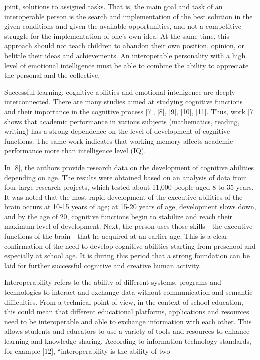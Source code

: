 \documentclass{article}
\begin{document}
\begin{multicols}{2}
joint, solutions to assigned tasks. That is, the main
goal and task of an interoperable person is the search
and implementation of the best solution in the given
conditions and given the available opportunities, and not
a competitive struggle for the implementation of one’s
own idea. At the same time, this approach should not
teach children to abandon their own position, opinion, or
belittle their ideas and achievements. An interoperable
personality with a high level of emotional intelligence
must be able to combine the ability to appreciate the
personal and the collective.
\par Successful learning, cognitive abilities and emotional
intelligence are deeply interconnected. There are many
studies aimed at studying cognitive functions and their
importance in the cognitive process [7], [8], [9], [10],
[11]. Thus, work [7] shows that academic performance
in various subjects (mathematics, reading, writing) has
a strong dependence on the level of development of
cognitive functions. The same work indicates that working memory affects academic performance more than
intelligence level (IQ).
\par In [8], the authors provide research data on the development of cognitive abilities depending on age. The
results were obtained based on an analysis of data from
four large research projects, which tested about 11,000
people aged 8 to 35 years. It was noted that the most rapid
development of the executive abilities of the brain occurs
at 10-15 years of age; at 15-20 years of age, development
slows down, and by the age of 20, cognitive functions
begin to stabilize and reach their maximum level of
development. Next, the person uses those skills—the
executive functions of the brain—that he acquired at an
earlier age. This is a clear confirmation of the need to
develop cognitive abilities starting from preschool and
especially at school age. It is during this period that
a strong foundation can be laid for further successful
cognitive and creative human activity.
\par Interoperability refers to the ability of different systems, programs and technologies to interact and exchange
data without communication and semantic difficulties.
From a technical point of view, in the context of school
education, this could mean that different educational
platforms, applications and resources need to be interoperable and able to exchange information with each other.
This allows students and educators to use a variety of
tools and resources to enhance learning and knowledge
sharing. According to information technology standards,
for example [12], “interoperability is the ability of two
\end{multicols}
\end{document}
